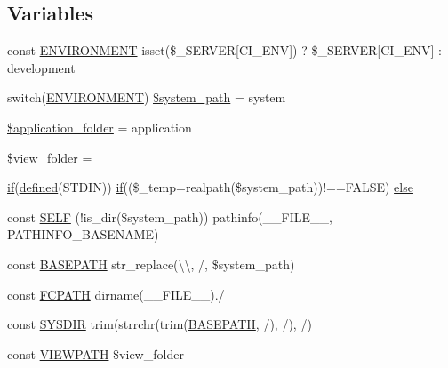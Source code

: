 \subsection*{Variables}
\begin{DoxyCompactItemize}
\item 
const \hyperlink{index_8php_a8757a57d09df5349f8b93b2083e29a1e}{E\+N\+V\+I\+R\+O\+N\+M\+E\+N\+T} isset(\$\+\_\+\+S\+E\+R\+V\+E\+R\mbox{[}\textquotesingle{}C\+I\+\_\+\+E\+N\+V\textquotesingle{}\mbox{]}) ? \$\+\_\+\+S\+E\+R\+V\+E\+R\mbox{[}\textquotesingle{}C\+I\+\_\+\+E\+N\+V\textquotesingle{}\mbox{]} \+: \textquotesingle{}development\textquotesingle{}
\item 
switch(\hyperlink{index_8php_a8757a57d09df5349f8b93b2083e29a1e}{E\+N\+V\+I\+R\+O\+N\+M\+E\+N\+T}) \hyperlink{index_8php_af832b0c9a5014f0bb87496701ceb30e5}{\$system\+\_\+path} = \textquotesingle{}system\textquotesingle{}
\item 
\hyperlink{index_8php_ace4309eda0b92e3260b226079bc17909}{\$application\+\_\+folder} = \textquotesingle{}application\textquotesingle{}
\item 
\hyperlink{index_8php_a974fdae9fe36c7e07e82bb71ed42b6b3}{\$view\+\_\+folder} = \textquotesingle{}\textquotesingle{}
\item 
\hyperlink{assets_2js_2bootstrap_8min_8js_a87cf461060832b8b68a7b48d9e371e4f}{if}(\hyperlink{_bootstrap_8php_a46458e8654a714e0565e20f63021add9}{defined}(\textquotesingle{}S\+T\+D\+I\+N\textquotesingle{})) \hyperlink{assets_2js_2bootstrap_8min_8js_a87cf461060832b8b68a7b48d9e371e4f}{if}((\$\+\_\+temp=realpath(\$system\+\_\+path))!==F\+A\+L\+S\+E) \hyperlink{index_8php_afe05baa2384a370483088b4c250fcd90}{else}
\item 
const \hyperlink{index_8php_a428c045e64680e1582ba74161e441a1c}{S\+E\+L\+F} (!is\+\_\+dir(\$system\+\_\+path)) pathinfo(\+\_\+\+\_\+\+F\+I\+L\+E\+\_\+\+\_\+, P\+A\+T\+H\+I\+N\+F\+O\+\_\+\+B\+A\+S\+E\+N\+A\+M\+E)
\item 
const \hyperlink{index_8php_ad39801cabfd338dc5524466fe793fda9}{B\+A\+S\+E\+P\+A\+T\+H} str\+\_\+replace(\textquotesingle{}\textbackslash{}\textbackslash{}\textquotesingle{}, \textquotesingle{}/\textquotesingle{}, \$system\+\_\+path)
\item 
const \hyperlink{index_8php_ae486546e58b2603595efedf9f95b3926}{F\+C\+P\+A\+T\+H} dirname(\+\_\+\+\_\+\+F\+I\+L\+E\+\_\+\+\_\+).\textquotesingle{}/\textquotesingle{}
\item 
const \hyperlink{index_8php_ab645ae0961792b1f2b4b83f89cb95fa5}{S\+Y\+S\+D\+I\+R} trim(strrchr(trim(\hyperlink{index_8php_ad39801cabfd338dc5524466fe793fda9}{B\+A\+S\+E\+P\+A\+T\+H}, \textquotesingle{}/\textquotesingle{}), \textquotesingle{}/\textquotesingle{}), \textquotesingle{}/\textquotesingle{})
\item 
const \hyperlink{index_8php_ade8921d52af58583e5727833459224c3}{V\+I\+E\+W\+P\+A\+T\+H} \$view\+\_\+folder
\end{DoxyCompactItemize}


